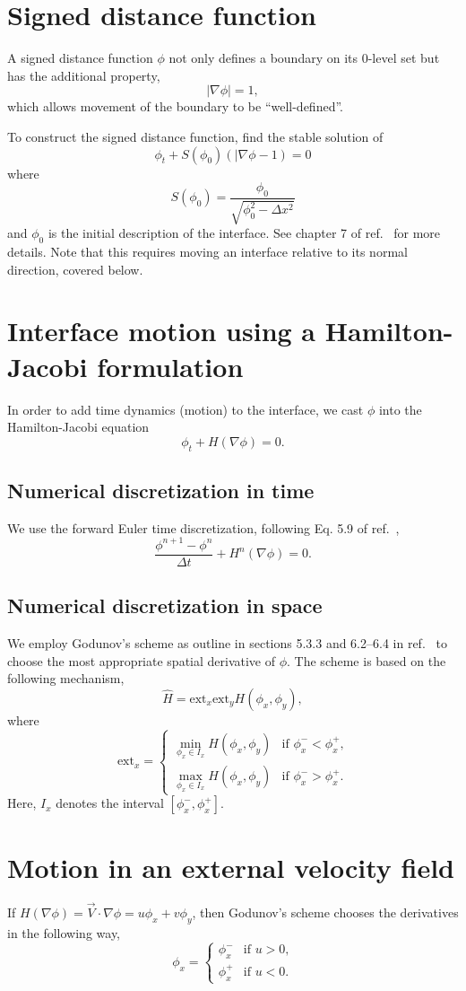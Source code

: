 \documentclass{article}
\newcommand{\be}{\begin{equation}}
\newcommand{\ee}{\end{equation}}
\newcommand{\grad}{\nabla}
\newcommand{\ext}{\text{ext}}
\begin{document}
\section{Signed distance function}
A signed distance function $\phi$ not only defines a boundary on its 0-level set but has the additional property,
    \be |\grad\phi| = 1, \ee
which allows movement of the boundary to be ``well-defined''.

To construct the signed distance function, find the stable solution of 
    \be \phi_t + S(\phi_0)(|\grad\phi - 1) = 0 \ee
where
    \be S(\phi_0) = \frac{\phi_0}{\sqrt{\phi_0^2 - \Delta x^2}} \ee
and $\phi_0$ is the initial description of the interface. See chapter 7 of ref.~\cite{OF} for more details. Note that this requires moving an interface relative to its normal direction, covered below.

\section{Interface motion using a Hamilton-Jacobi formulation}
In order to add time dynamics (motion) to the interface, we cast $\phi$ into the Hamilton-Jacobi equation
\be \phi_t + H(\grad \phi) = 0. \ee

\subsection{Numerical discretization in time}
We use the forward Euler time discretization, following Eq. 5.9 of ref.~\cite{OF},
\be \frac{\phi^{n+1} - \phi^n}{\Delta t} + H^n(\grad \phi) = 0. \ee

\subsection{Numerical discretization in space}
We employ Godunov's scheme as outline in sections 5.3.3 and 6.2--6.4 in ref.~\cite{OF} to choose the most appropriate spatial derivative of $\phi$. 
The scheme is based on the following mechanism,
\be \hat{H} = \ext_x \ext_y H(\phi_x, \phi_y), \ee
where
\be \ext_x = \begin{cases}
    \min_{\phi_x \in I_x} H(\phi_x, \phi_y)& \text{if $\phi_x^- < \phi_x^+$,} \\
    \max_{\phi_x \in I_x} H(\phi_x, \phi_y)& \text{if $\phi_x^- > \phi_x^+$.}
    \end{cases} \ee
Here, $I_x$ denotes the interval $[\phi_x^-, \phi_x^+]$.


\section{Motion in an external velocity field}
If $H(\grad \phi) = \vec{V} \cdot \grad \phi = u\phi_x + v\phi_y$, then Godunov's scheme chooses the derivatives in the following way,
\be \phi_x = \begin{cases}
    \phi_x^- & \text{if $u > 0$,} \\
    \phi_x^+ & \text{if $u < 0$.} \end{cases} \ee
\end{document}
